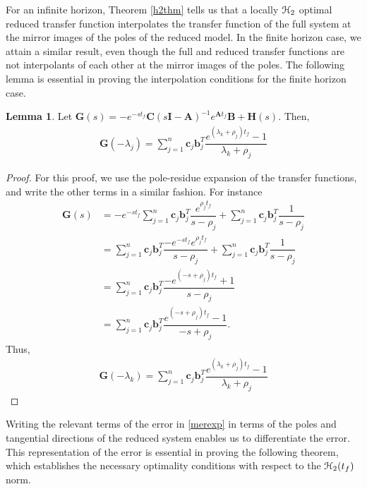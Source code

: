 \documentclass[preprint]{elsarticle}
\theoremstyle{definition}
\theoremstyle{definition}
\def\mathcal{\EuScript}
\numberwithin{equation}{section}
\newtheorem{Lemma}[Theorem]{Lemma}
\newcommand{\A}{\mathbf{A}}
\newcommand{\B}{\mathbf{B}}
\newcommand{\I}{\mathbf{I}}
\newcommand{\G}{\mathbf{G}}
\newcommand{\C}{\mathbf{C}}
\newcommand{\HH}{\mathbf{H}}
\newcommand{\tf}{t_f}
\newcommand{\cc}{\boldsymbol{c}}
\newcommand{\bb}{\boldsymbol{b}}
\newcommand{\ch}{\mathcal{H}}
\begin{document}
For an infinite horizon, Theorem \ref{h2thm} tells us that a locally $\ch_2$ optimal reduced transfer function interpolates the transfer function of the full system at the mirror images of the poles of the reduced model. In the finite horizon case, we attain a similar result, even though the full and reduced transfer functions are not interpolants of each other at the mirror images of the poles. The following lemma is essential in proving the interpolation conditions for the finite horizon case.

\begin{Lemma}\label{mgexp}
Let $\G(s)=-e^{-s{\tf}}\C(s\I-\A)^{-1}e^{\A {\tf}}\B+\HH(s)$. Then,
\begin{equation}
\begin{aligned}
\G(-\lambda_j)=\sum_{j=1}^n\cc_j\bb_j^T\dfrac{e^{(\lambda_k+\rho_j){\tf}}-1}{\lambda_k+\rho_j}
\end{aligned}
\end{equation}
\end{Lemma}
\begin{proof}
For this proof, we use the pole-residue expansion of the transfer functions, and write the other terms in a similar fashion. For instance
\begin{align*}
\G(s)&=-e^{-s{\tf}}\sum_{j=1}^n\cc_j\bb_j^T\dfrac{e^{\rho_j\tf}}{s-\rho_j}+\sum_{j=1}^n\cc_j\bb_j^T\dfrac{1}{s-\rho_j}\\
&=\sum_{j=1}^n\cc_j\bb_j^T\dfrac{-e^{-s{\tf}}e^{\rho_j\tf}}{s-\rho_j}+\sum_{j=1}^n\cc_j\bb_j^T\dfrac{1}{s-\rho_j}\\
&=\sum_{j=1}^n\cc_j\bb_j^T\dfrac{-e^{(-s+\rho_j)\tf}+1}{s-\rho_j}\\
&=\sum_{j=1}^n\cc_j\bb_j^T\dfrac{e^{(-s+\rho_j)\tf}-1}{-s+\rho_j}.
\end{align*}
Thus,
\begin{align*}
\G(-\lambda_k)=\sum_{j=1}^n\cc_j\bb_j^T\dfrac{e^{(\lambda_k+\rho_j){\tf}}-1}{\lambda_k+\rho_j}
\end{align*}
\end{proof}

Writing the relevant terms of the error in \eqref{merexp} in terms of the poles and tangential directions of the reduced system enables us to differentiate the error. This representation of the error is essential in proving the following theorem, which establishes the necessary optimality conditions with respect to the $\ch_2(\tf)$ norm.
\end{document}
